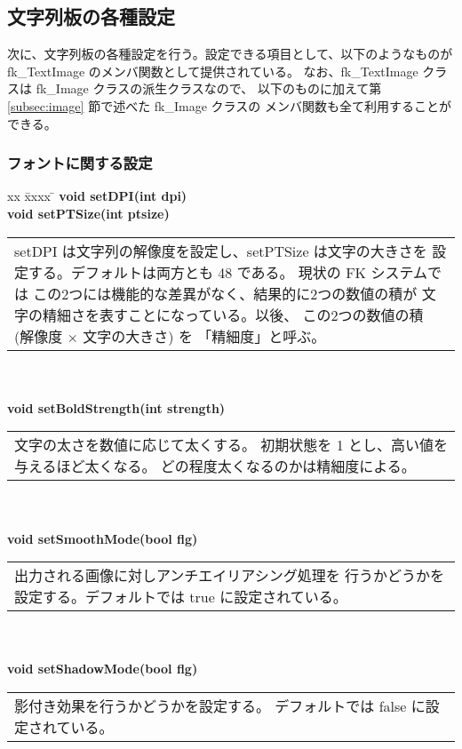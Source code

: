 \subsection{文字列板の各種設定}
次に、文字列板の各種設定を行う。設定できる項目として、以下のようなものが
fk\_TextImage のメンバ関数として提供されている。
なお、fk\_TextImage クラスは fk\_Image クラスの派生クラスなので、
以下のものに加えて第 \ref{subsec:image} 節で述べた fk\_Image クラスの
メンバ関数も全て利用することができる。

\subsubsection{フォントに関する設定}
\begin{tabbing}
xx \= xxxx \= \kill
\> \textbf{void setDPI(int dpi)} \\
\> \textbf{void setPTSize(int ptsize)} \\
	\> \> \begin{tabular}{p{15cm}}
		setDPI は文字列の解像度を設定し、setPTSize は文字の大きさを
		設定する。デフォルトは両方とも 48 である。
		現状の FK システムでは
		この2つには機能的な差異がなく、結果的に2つの数値の積が
		文字の精細さを表すことになっている。以後、
		この2つの数値の積 (解像度 \(\times\) 文字の大きさ) を
		「精細度」と呼ぶ。
	\end{tabular} \\ \\

\> \textbf{void setBoldStrength(int strength)} \\
	\> \> \begin{tabular}{p{15cm}}
		文字の太さを数値に応じて太くする。
		初期状態を 1 とし、高い値を与えるほど太くなる。
		どの程度太くなるのかは精細度による。
	\end{tabular} \\ \\

\> \textbf{void setSmoothMode(bool flg)} \\
	\> \> \begin{tabular}{p{15cm}}
		出力される画像に対しアンチエイリアシング処理を
		行うかどうかを設定する。デフォルトでは true に設定されている。
	\end{tabular} \\ \\

\> \textbf{void setShadowMode(bool flg)} \\
	\> \> \begin{tabular}{p{15cm}}
		影付き効果を行うかどうかを設定する。
		デフォルトでは false に設定されている。
	\end{tabular} \\ \\


\end{tabbing}
